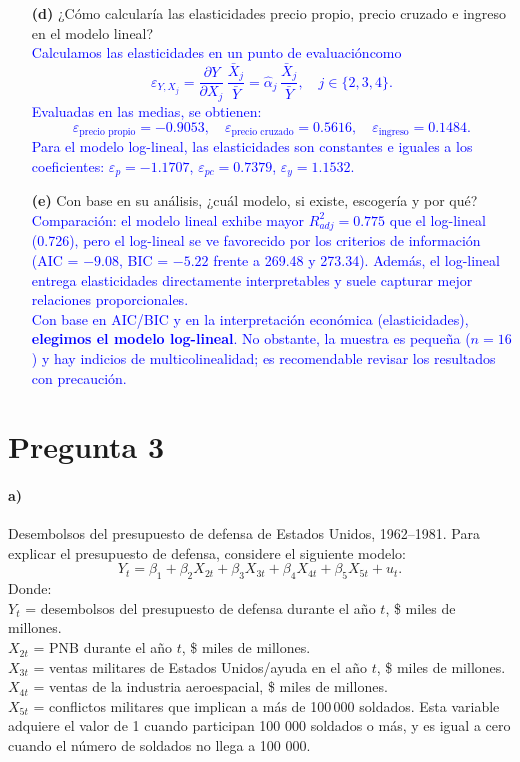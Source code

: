 \documentclass[10pt]{article}
\begin{document}
\begin{enumerate}
    \item[\textbf{(d)}] ¿Cómo calcularía las elasticidades precio propio, precio cruzado e ingreso en el modelo lineal?\\
    \textcolor{blue}{
        Calculamos las elasticidades en un punto de evaluacióncomo
        \[
        \varepsilon_{Y,X_j}= \frac{\partial Y}{\partial X_j}\,\frac{\bar X_j}{\bar Y}=\hat{\alpha}_j\,\frac{\bar X_j}{\bar Y},\quad j\in\{2,3,4\}.
        \]
        Evaluadas en las medias, se obtienen:
        \[
        \varepsilon_{\text{precio propio}}=-0.9053,\quad \varepsilon_{\text{precio cruzado}}=0.5616,\quad \varepsilon_{\text{ingreso}}=0.1484.
        \]
        Para el modelo log-lineal, las elasticidades son constantes e iguales a los coeficientes: \(\varepsilon_{p}=-1.1707\), \(\varepsilon_{pc}=0.7379\), \(\varepsilon_{y}=1.1532\).
    }
    
    \item[\textbf{(e)}] Con base en su análisis, ¿cuál modelo, si existe, escogería y por qué?\\
    \textcolor{blue}{
        Comparación: el modelo lineal exhibe mayor \(R^2_{adj}=0.775\) que el log-lineal (0.726), pero el log-lineal se ve favorecido por los criterios de información (AIC = \(-9.08\), BIC = \(-5.22\) frente a 269.48 y 273.34). Además, el log-lineal entrega elasticidades directamente interpretables y suele capturar mejor relaciones proporcionales.\\
        Con base en AIC/BIC y en la interpretación económica (elasticidades), \textbf{elegimos el modelo log-lineal}. No obstante, la muestra es pequeña (\(n=16\)) y hay indicios de multicolinealidad; es recomendable revisar los resultados con precaución.
    }
\end{enumerate}
\section{Pregunta 3}

\paragraph*{a)} Desembolsos del presupuesto de defensa de Estados Unidos, 1962--1981. Para explicar el presupuesto de defensa, considere el siguiente modelo:
\[
Y_t = \beta_1 + \beta_2 X_{2t} + \beta_3 X_{3t} + \beta_4 X_{4t} + \beta_5 X_{5t} + u_t.
\]
Donde: \\
$Y_t$ = desembolsos del presupuesto de defensa durante el año $t$, \$ miles de millones.\\
$X_{2t}$ = PNB durante el año $t$, \$ miles de millones.\\
$X_{3t}$ = ventas militares de Estados Unidos/ayuda en el año $t$, \$ miles de millones.\\
$X_{4t}$ = ventas de la industria aeroespacial, \$ miles de millones.\\
$X_{5t}$ = conflictos militares que implican a más de 100\,000 soldados. Esta variable adquiere el valor de 1 cuando
participan 100 000 soldados o más, y es igual a cero cuando el número de soldados no llega a 100 000. 
\end{document}
